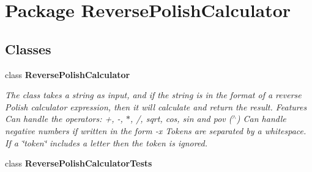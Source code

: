 \section{Package Reverse\+Polish\+Calculator}
\label{namespace_reverse_polish_calculator}
\subsection*{Classes}
\begin{DoxyCompactItemize}
\item 
class {\bf Reverse\+Polish\+Calculator}
\begin{DoxyCompactList}\small\item\em The class takes a string as input, and if the string is in the format of a reverse Polish calculator expression, then it will calculate and return the result. Features Can handle the operators\+: +, -\/, $\ast$, /, sqrt, cos, sin and pov ($^\wedge$) Can handle negative numbers if written in the form -\/x Tokens are separated by a whitespace. If a \char`\"{}token\char`\"{} includes a letter then the token is ignored. \end{DoxyCompactList}\item 
class {\bf Reverse\+Polish\+Calculator\+Tests}
\end{DoxyCompactItemize}
